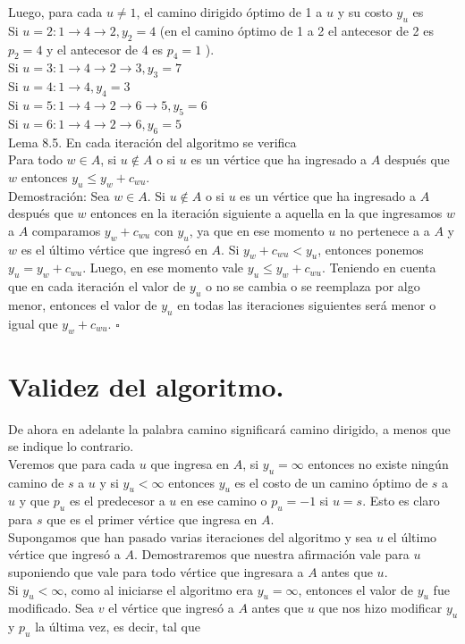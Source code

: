 \documentclass[10pt]{article}
\begin{document}
Luego, para cada $u \neq 1$, el camino dirigido óptimo de 1 a $u$ y su costo $y_{u}$ es\\
Si $u=2: 1 \longrightarrow 4 \longrightarrow 2, y_{2}=4$ (en el camino óptimo de 1 a 2 el antecesor de 2 es $p_{2}=4$ y el antecesor de 4 es $p_{4}=1$ ).\\
Si $u=3: 1 \longrightarrow 4 \longrightarrow 2 \longrightarrow 3, y_{3}=7$\\
Si $u=4: 1 \longrightarrow 4, y_{4}=3$\\
Si $u=5: 1 \longrightarrow 4 \longrightarrow 2 \longrightarrow 6 \longrightarrow 5, y_{5}=6$\\
Si $u=6: 1 \longrightarrow 4 \longrightarrow 2 \longrightarrow 6, y_{6}=5$\\
Lema 8.5. En cada iteración del algoritmo se verifica\\
Para todo $w \in A$, si $u \notin A$ o si $u$ es un vértice que ha ingresado a $A$ después que $w$ entonces $y_{u} \leq y_{w}+c_{w u}$.\\
Demostración: Sea $w \in A$. Si $u \notin A$ o si $u$ es un vértice que ha ingresado a $A$ después que $w$ entonces en la iteración siguiente a aquella en la que ingresamos $w$ a $A$ comparamos $y_{w}+c_{w u}$ con $y_{u}$, ya que en ese momento $u$ no pertenece a a $A$ y $w$ es el último vértice que ingresó en $A$. Si $y_{w}+c_{w u}<y_{u}$, entonces ponemos $y_{u}=y_{w}+c_{w u}$. Luego, en ese momento vale $y_{u} \leq y_{w}+c_{w u}$. Teniendo en cuenta que en cada iteración el valor de $y_{u}$ o no se cambia o se reemplaza por algo menor, entonces el valor de $y_{u}$ en todas las iteraciones siguientes será menor o igual que $y_{w}+c_{w u}$. $\square$

\section*{Validez del algoritmo.}
De ahora en adelante la palabra camino significará camino dirigido, a menos que se indique lo contrario.\\
Veremos que para cada $u$ que ingresa en $A$, si $y_{u}=\infty$ entonces no existe ningún camino de $s$ a $u$ y si $y_{u}<\infty$ entonces $y_{u}$ es el costo de un camino óptimo de $s$ a $u$ y que $p_{u}$ es el predecesor a $u$ en ese camino o $p_{u}=-1$ si $u=s$. Esto es claro para $s$ que es el primer vértice que ingresa en $A$.\\
Supongamos que han pasado varias iteraciones del algoritmo y sea $u$ el último vértice que ingresó a $A$. Demostraremos que nuestra afirmación vale para $u$ suponiendo que vale para todo vértice que ingresara a $A$ antes que $u$.\\
Si $y_{u}<\infty$, como al iniciarse el algoritmo era $y_{u}=\infty$, entonces el valor de $y_{u}$ fue modificado. Sea $v$ el vértice que ingresó a $A$ antes que $u$ que nos hizo modificar $y_{u}$ y $p_{u}$ la última vez, es decir, tal que
\end{document}
